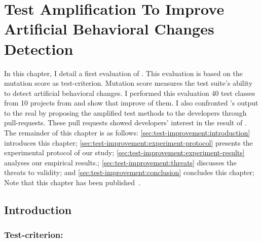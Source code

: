 \chapter{Test Amplification To Improve Artificial Behavioral Changes Detection}

\begin{chaptersummary}
	In this chapter, I detail a first evaluation of \dspot. 
	This evaluation is based on the mutation score as test-criterion.
	Mutation score measures the test suite's ability to detect artificial behavioral changes.
	I performed this evaluation 40 test classes from 10 projects from \gh and show that \dspot improve  of them.
	I also confronted \dspot's output to the real by proposing the amplified test methods to the developers through pull-requests.
	These pull requests showed developers' interest in the result of \dspot.
	The remainder of this chapter is as follows:
	\autoref{sec:test-improvement:introduction} introduces this chapter;
	\autoref{sec:test-improvement:experiment-protocol} presents the experimental protocol of our study;
	\autoref{sec:test-improvement:experiment-results} analyses our empirical results.;
	\autoref{sec:test-improvement:threats} discusses the threats to validity;
	and \autoref{sec:test-improvement:conclusion} concludes this chapter;
	Note that this chapter has been published~\cite{Danglot2019}.
\end{chaptersummary}

\minitoc

\graphicspath{{.}{chapitres/test-improvement/}}

\section{Introduction}
\label{sec:test-improvement:introduction}

\subsection{Test-criterion: \ms}
\label{subsec:test-improvement:introduction:test-criterion}


